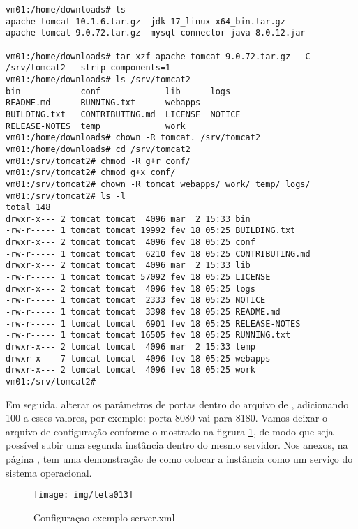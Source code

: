 \begin{lstlisting}[breaklines=true,basicstyle=\firacoderetina,
breaklines=true,caption=\firacoderetina Instalando segunda instância tomcat,
postbreak=\mbox{\textcolor{red}{$\hookrightarrow$}\space},
showstringspaces=false]
vm01:/home/downloads# ls
apache-tomcat-10.1.6.tar.gz  jdk-17_linux-x64_bin.tar.gz
apache-tomcat-9.0.72.tar.gz  mysql-connector-java-8.0.12.jar

vm01:/home/downloads# tar xzf apache-tomcat-9.0.72.tar.gz  -C /srv/tomcat2 --strip-components=1 
vm01:/home/downloads# ls /srv/tomcat2
bin            conf             lib      logs    
README.md      RUNNING.txt      webapps
BUILDING.txt   CONTRIBUTING.md  LICENSE  NOTICE  
RELEASE-NOTES  temp             work
vm01:/home/downloads# chown -R tomcat. /srv/tomcat2 
vm01:/home/downloads# cd /srv/tomcat2
vm01:/srv/tomcat2# chmod -R g+r conf/
vm01:/srv/tomcat2# chmod g+x conf/
vm01:/srv/tomcat2# chown -R tomcat webapps/ work/ temp/ logs/ 
vm01:/srv/tomcat2# ls -l
total 148
drwxr-x--- 2 tomcat tomcat  4096 mar  2 15:33 bin
-rw-r----- 1 tomcat tomcat 19992 fev 18 05:25 BUILDING.txt
drwxr-x--- 2 tomcat tomcat  4096 fev 18 05:25 conf
-rw-r----- 1 tomcat tomcat  6210 fev 18 05:25 CONTRIBUTING.md
drwxr-x--- 2 tomcat tomcat  4096 mar  2 15:33 lib
-rw-r----- 1 tomcat tomcat 57092 fev 18 05:25 LICENSE
drwxr-x--- 2 tomcat tomcat  4096 fev 18 05:25 logs
-rw-r----- 1 tomcat tomcat  2333 fev 18 05:25 NOTICE
-rw-r----- 1 tomcat tomcat  3398 fev 18 05:25 README.md
-rw-r----- 1 tomcat tomcat  6901 fev 18 05:25 RELEASE-NOTES
-rw-r----- 1 tomcat tomcat 16505 fev 18 05:25 RUNNING.txt
drwxr-x--- 2 tomcat tomcat  4096 mar  2 15:33 temp
drwxr-x--- 7 tomcat tomcat  4096 fev 18 05:25 webapps
drwxr-x--- 2 tomcat tomcat  4096 fev 18 05:25 work
vm01:/srv/tomcat2# 

\end{lstlisting}

Em seguida, alterar os parâmetros de portas dentro do arquivo de , adicionando 100 a esses valores, por exemplo: porta 8080 vai para 8180. Vamos deixar o arquivo de configuração conforme o mostrado na figrura \ref{fig:tomcat-i2-serverxml}, de modo que seja possível subir uma segunda instância dentro do mesmo servidor. Nos anexos, na página \pageref{apendice:servico}, tem uma demonstração de como colocar a instância como um serviço do sistema operacional.

\begin{figure}[p]
	\centering
	\caption[server.xml]{Configuraçao exemplo server.xml}
	\texttt{[image: img/tela013]}
	\label{fig:tomcat-i2-serverxml}
\end{figure}

